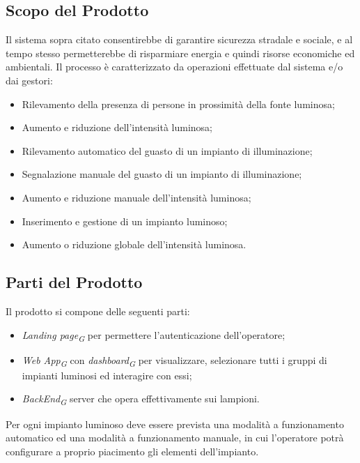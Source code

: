 \documentclass[a4paper, 12pt]{article}
\begin{document}
\subsection{Scopo del Prodotto}
Il sistema sopra citato consentirebbe di garantire sicurezza stradale e sociale, e al tempo stesso permetterebbe di risparmiare energia e quindi risorse economiche ed ambientali. Il processo è caratterizzato da operazioni effettuate dal sistema e/o dai gestori:
\begin{itemize}
    \item Rilevamento della presenza di persone in prossimità della fonte luminosa;
    \item Aumento e riduzione dell'intensità luminosa;
    \item Rilevamento automatico del guasto di un impianto di illuminazione;
    \item Segnalazione manuale del guasto di un impianto di illuminazione;
    \item Aumento e riduzione manuale dell'intensità luminosa;
    \item Inserimento e gestione di un impianto luminoso;
    \item Aumento o riduzione globale dell'intensità luminosa. 
\end{itemize}

\subsection{Parti del Prodotto}
Il prodotto si compone delle seguenti parti: %
\begin{itemize}
    \item \textit{Landing page\textsubscript{G}} per permettere l'autenticazione dell'operatore;
    \item \textit{Web App\textsubscript{G}} con \textit{dashboard\textsubscript{G}} per visualizzare, selezionare tutti i gruppi di
    impianti luminosi ed interagire con essi;
    \item \textit{BackEnd\textsubscript{G}} server che opera effettivamente sui lampioni.
\end{itemize}
Per ogni impianto luminoso deve essere prevista una modalità a funzionamento
automatico ed una modalità a funzionamento manuale, in cui l'operatore potrà
configurare a proprio piacimento gli elementi dell'impianto. 
\end{document}
